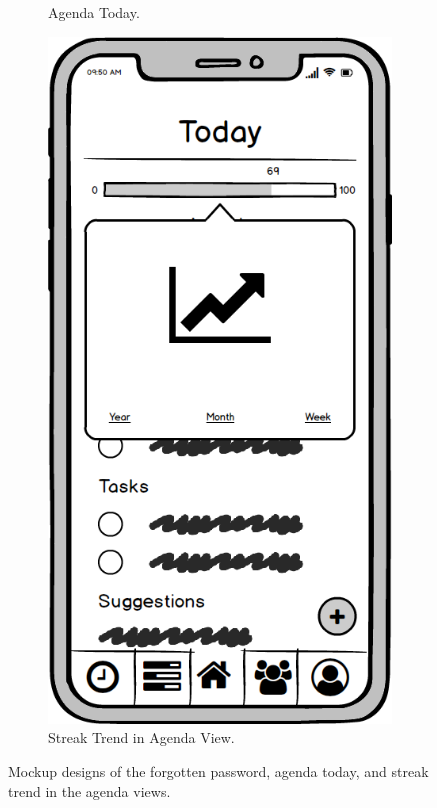 \begin{figure}
\begin{subfigure}[b]{0.3\textwidth}
        \caption{Agenda Today.}
        \label{fig:dashboard_agenda_today}
    \end{subfigure}
    \hfill
    \begin{subfigure}[b]{0.3\textwidth}
        \centering
        \includegraphics[width=\textwidth]{./graphics/design/Dashboard (Streak trend Agenda View).png}
        \caption{Streak Trend in Agenda View.}
        \label{fig:dashboard_streak_agenda}
    \end{subfigure}
    
    \caption{Mockup designs of the forgotten password, agenda today, and streak trend in the agenda views.}
    \label{fig:forgotten_todayagenda_agendastreak}
\end{figure}

